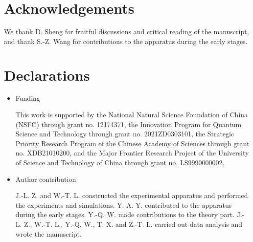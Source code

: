 \documentclass[pdflatex,sn-nature,centre]{sn-jnl}%
\begin{document}
\section*{Acknowledgements}
We thank D. Sheng for fruitful discussions and critical reading of the manuscript, and thank S.-Z. Wang for contributions to the apparatus during the early stages. 

\section*{Declarations}


\begin{itemize}
\item Funding

This work is supported by the National Natural Science Foundation of China (NSFC) through grant no. 12174371, the Innovation Program for Quantum Science and Technology through grant no. 2021ZD0303101, the Strategic Priority Research Program of the Chinese Academy of Sciences through grant no. XDB21010200, and the Major Frontier Research Project of the University of Science and Technology of China through grant no. LS9990000002.

\item Author contribution

J.-L. Z. and W.-T. L. constructed the experimental apparatus and performed the experiments and simulations. Y. A. Y. contributed to the apparatus during the early stages. Y.-Q. W. made contributions to the theory part. J.-L. Z., W.-T. L., Y.-Q. W., T. X. and Z.-T. L. carried out data analysis and wrote the manuscript.

\end{itemize}
\end{document}
